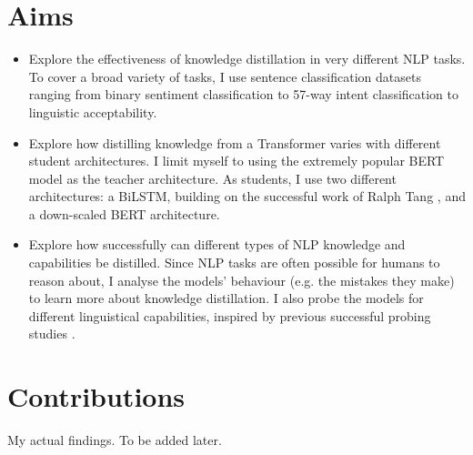 \documentclass[bsc,frontabs,twoside,singlespacing,parskip,deptreport]{infthesis}
\begin{document}
{  \section{Aims}{
    \begin{itemize}
      \item Explore the effectiveness of knowledge distillation in very different NLP tasks. To cover a broad variety of tasks, I use sentence classification datasets ranging from binary sentiment classification to 57-way intent classification to linguistic acceptability.
      \item Explore how distilling knowledge from a Transformer varies with different student architectures. I limit myself to using the extremely popular BERT model \citep{Devlin_2018} as the teacher architecture. As students, I use two different architectures: a BiLSTM, building on the successful work of Ralph Tang \citep{Tang_2019a,Tang_2019b}, and a down-scaled BERT architecture.
      \item Explore how successfully can different types of NLP knowledge and capabilities be distilled. Since NLP tasks are often possible for humans to reason about, I analyse the models' behaviour (e.g. the mistakes they make) to learn more about knowledge distillation. I also probe the models for different linguistical capabilities, inspired by previous successful probing studies \citep{Conneau_2018,Tenney_2019b}.
    \end{itemize}
  }
  
  \section{Contributions}{
    My actual findings. To be added later.
  }
}
\end{document}
